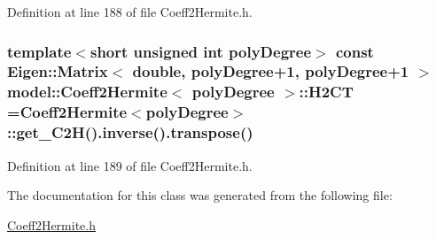 Definition at line 188 of file Coeff2\+Hermite.\+h.

\hypertarget{classmodel_1_1_coeff2_hermite_a8bb020beda0ad879a53c84553a560b67}{}
\subsubsection[{H2\+C\+T}]{\setlength{\rightskip}{0pt plus 5cm}template$<$short unsigned int poly\+Degree$>$ const Eigen\+::\+Matrix$<$ double, poly\+Degree+1, poly\+Degree+1 $>$ {\bf model\+::\+Coeff2\+Hermite}$<$ poly\+Degree $>$\+::H2\+C\+T ={\bf Coeff2\+Hermite}$<$poly\+Degree$>$\+::get\+\_\+\+C2\+H().inverse().transpose()\hspace{0.3cm}{\ttfamily [static]}}\label{classmodel_1_1_coeff2_hermite_a8bb020beda0ad879a53c84553a560b67}


Definition at line 189 of file Coeff2\+Hermite.\+h.



The documentation for this class was generated from the following file\+:\begin{DoxyCompactItemize}
\item 
\hyperlink{_coeff2_hermite_8h}{Coeff2\+Hermite.\+h}\end{DoxyCompactItemize}
